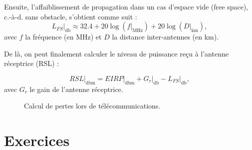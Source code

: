 \documentclass [a4paper, 11pt] {article}
\begin{document}
    Ensuite, l'affaiblissement de propagation dans un cas d'espace vide (free space), c.-à-d. sans obstacle, s'obtient comme suit :
    \begin{equation}
        L_{FS}\Big|_{\si{\decibel}} \approx 32.4 + 20 \log(f\Big|_{\si{\mega\hertz}}) + 20 \log(D\Big|_{\si{\kilo\meter}}),
    \end{equation}
    avec $f$ la fréquence (en \si{\mega\hertz}) et $D$ la distance inter-antennes (en \si{\kilo\meter}).
    
    De là, on peut finalement calculer le niveau de puissance reçu à l'antenne réceptrice (RSL) :
    
    \begin{equation}
        RSL\Big|_{\si{\decibel\meter}} = EIRP\Big|_{\si{\decibel\meter}} + G_r\Big|_{\si{\decibel}} - L_{FS}\Big|_{\si{\decibel}},
    \end{equation}
    avec $G_r$ le gain de l'antenne réceptrice.
    
    \begin{figure}[H]
            \centering
            \caption{Calcul de pertes lors de télécommunications.}
            \label{fig:radio_losses}
        \end{figure}
    
    \pagebreak
    \part*{Exercices}
    
\end{document}

